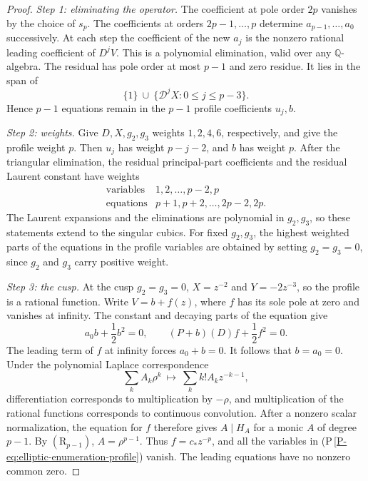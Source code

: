 \documentclass[11pt]{article}
\newcommand{\QQ}{\mathbb Q}
\numberwithin{equation}{section}
\begin{document}
\begin{proof}
\emph{Step 1: eliminating the operator.}
The coefficient at pole order \(2p\) vanishes by the choice of
\(s_p\).
The coefficients at orders \(2p-1,\ldots,p\) determine
\(a_{p-1},\ldots,a_0\) successively.
At each step the coefficient of the new \(a_j\) is the nonzero
rational leading coefficient of \(D^jV\).
This is a polynomial elimination, valid over any
\(\QQ\)-algebra.
The residual has pole order at most \(p-1\) and zero residue.
It lies in the span of
\[
 \{1\}\ \cup\ \{\mathscr D^jX:0\le j\le p-3\}.
\]
Hence \(p-1\) equations remain in the \(p-1\) profile
coefficients \(u_j,b\).

\emph{Step 2: weights.}
Give \(D,X,g_2,g_3\) weights \(1,2,4,6\), respectively, and give
the profile weight \(p\).
Then \(u_j\) has weight \(p-j-2\), and \(b\) has weight \(p\).
After the triangular elimination, the residual principal-part
coefficients and the residual Laurent constant have weights
\begin{equation}\label{eq:elliptic-weights}
 \begin{array}{c|c}
 \text{variables}&1,2,\ldots,p-2,p\\
 \text{equations}&p+1,p+2,\ldots,2p-2,2p.
 \end{array}
\end{equation}
The Laurent expansions and the eliminations are polynomial in
\(g_2,g_3\), so these statements extend to the singular cubics.
For fixed \(g_2,g_3\), the highest weighted parts of the equations in
the profile variables are obtained by setting \(g_2=g_3=0\), since
\(g_2\) and \(g_3\) carry positive weight.

\emph{Step 3: the cusp.}
At the cusp \(g_2=g_3=0\), \(X=z^{-2}\) and \(Y=-2z^{-3}\), so the
profile is a rational function.
Write \(V=b+f(z)\), where \(f\) has its sole pole at zero
and vanishes at infinity.
The constant and decaying parts of the equation give
\[
 a_0b+\frac12b^2=0,\qquad
 (P+b)(D)f+\frac12f^2=0.
\]
The leading term of \(f\) at infinity forces \(a_0+b=0\).
It follows that \(b=a_0=0\).
Under the polynomial Laplace correspondence
\[
 \sum_k A_k\rho^k\ \longmapsto\
       \sum_k k!A_k z^{-k-1},
\]
differentiation corresponds to multiplication by \(-\rho\),
and multiplication of the rational functions corresponds to
continuous convolution.
After a nonzero scalar normalization, the equation for \(f\)
therefore gives \(A\mid H_A\) for a monic \(A\) of degree \(p-1\).
By \((\mathrm R_{p-1})\), \(A=\rho^{p-1}\).
Thus \(f=c_\ast z^{-p}\), and all the variables in
(P\,\ref{P-eq:elliptic-enumeration-profile}) vanish.
The leading equations have no nonzero common zero.


\end{proof}
\end{document}
